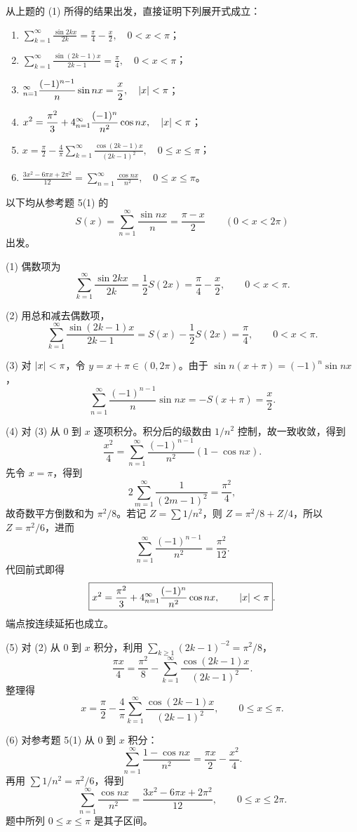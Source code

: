 \begin{xreferenceproblem}[6]
从上题的 (1) 所得的结果出发，直接证明下列展开式成立：
  \begin{enumerate}[label=(\arabic*)]
    \item $\displaystyle \sum_{k=1}^{\infty}\frac{\sin2kx}{2k}=\frac\pi4-\frac x2,\quad0<x<\pi$；
    \item $\displaystyle \sum_{k=1}^{\infty}\frac{\sin(2k-1)x}{2k-1}=\frac\pi4,\quad0<x<\pi$；
    \item $\displaystyle \relax_{n=1}^{\infty}\frac{(-1)^{n-1}}n\sin nx=\frac x2,\quad\lvert x\rvert<\pi$；
    \item $\displaystyle x^2=\frac{\pi^2}{3}+4\relax_{n=1}^{\infty}\frac{(-1)^n}{n^2}\cos nx,\quad\lvert x\rvert<\pi$；
    \item $\displaystyle x=\frac\pi2-\frac4\pi\sum_{k=1}^{\infty}\frac{\cos(2k-1)x}{(2k-1)^2},\quad0\le x\le\pi$；
    \item $\displaystyle \frac{3x^2-6\pi x+2\pi^2}{12}=\sum_{n=1}^{\infty}\frac{\cos nx}{n^2},\quad0\le x\le\pi$。
  \end{enumerate}
\end{xreferenceproblem}
\begin{xsolution}
以下均从参考题 5(1) 的
\[
  S(x)=\sum_{n=1}^{\infty}\frac{\sin nx}{n}=\frac{\pi-x}{2}
  \qquad(0<x<2\pi)
\]
出发。

(1) 偶数项为
\[
  \sum_{k=1}^{\infty}\frac{\sin2kx}{2k}=\frac12S(2x)
  =\boxed{\frac\pi4-\frac x2},\qquad0<x<\pi.
\]

(2) 用总和减去偶数项，
\[
  \sum_{k=1}^{\infty}\frac{\sin(2k-1)x}{2k-1}
  =S(x)-\frac12S(2x)=\boxed{\frac\pi4},
  \qquad0<x<\pi.
\]

(3) 对 $\lvert x\rvert<\pi$，令 $y=x+\pi\in(0,2\pi)$。由于
$\sin n(x+\pi)=(-1)^n\sin nx$，
\[
  \sum_{n=1}^{\infty}\frac{(-1)^{n-1}}n\sin nx
  =-S(x+\pi)=\boxed{\frac x2}.
\]

(4) 对 (3) 从 $0$ 到 $x$ 逐项积分。积分后的级数由 $1/n^2$ 控制，故一致收敛，得到
\[
  \frac{x^2}{4}
  =\sum_{n=1}^{\infty}\frac{(-1)^{n-1}}{n^2}(1-\cos nx).
\]
先令 $x=\pi$，得到
\[
  2\sum_{m=1}^{\infty}\frac1{(2m-1)^2}=\frac{\pi^2}{4},
\]
故奇数平方倒数和为 $\pi^2/8$。若记 $Z=\sum1/n^2$，则
$Z=\pi^2/8+Z/4$，所以 $Z=\pi^2/6$，进而
\[
  \sum_{n=1}^{\infty}\frac{(-1)^{n-1}}{n^2}=\frac{\pi^2}{12}.
\]
代回前式即得
\[
  \boxed{\displaystyle
  x^2=\frac{\pi^2}{3}
  +4\relax_{n=1}^{\infty}\frac{(-1)^n}{n^2}\cos nx,
  \qquad\lvert x\rvert<\pi }.
\]
端点按连续延拓也成立。

(5) 对 (2) 从 $0$ 到 $x$ 积分，利用
$\sum_{k\ge1}(2k-1)^{-2}=\pi^2/8$，
\[
  \frac{\pi x}{4}
  =\frac{\pi^2}{8}-
  \sum_{k=1}^{\infty}\frac{\cos(2k-1)x}{(2k-1)^2}.
\]
整理得
\[
  \boxed{\displaystyle
  x=\frac\pi2-\frac4\pi
  \sum_{k=1}^{\infty}\frac{\cos(2k-1)x}{(2k-1)^2},
  \qquad0\le x\le\pi }.
\]

(6) 对参考题 5(1) 从 $0$ 到 $x$ 积分：
\[
  \sum_{n=1}^{\infty}\frac{1-\cos nx}{n^2}
  =\frac{\pi x}{2}-\frac{x^2}{4}.
\]
再用 $\sum1/n^2=\pi^2/6$，得到
\[
  \boxed{\displaystyle
  \sum_{n=1}^{\infty}\frac{\cos nx}{n^2}
  =\frac{3x^2-6\pi x+2\pi^2}{12},
  \qquad0\le x\le2\pi }.
\]
题中所列 $0\le x\le\pi$ 是其子区间。
\end{xsolution}


